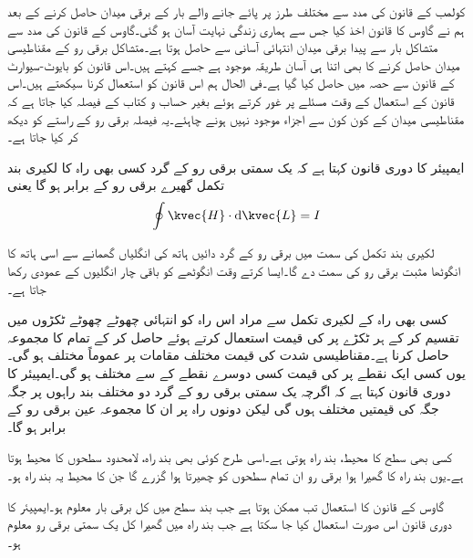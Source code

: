 کولمب کے قانون کی مدد سے مختلف طرز پر پائے جانے والے بار کے برقی میدان حاصل کرنے کے بعد ہم نے گاوس کا قانون اخذ کیا جس سے ہماری زندگی نہایت آسان ہو گئی۔گاوس کے قانون کی مدد سے متشاکل بار سے پیدا برقی میدان انتہائی آسانی سے حاصل ہوتا ہے۔متشاکل برقی رو کے مقناطیسی میدان حاصل کرنے کا بھی اتنا ہی آسان طریقہ موجود ہے جسے  کہتے ہیں۔اس قانون کو بایوٹ-سیوارٹ کے قانون سے حصہ  میں حاصل کیا گیا ہے۔فی الحال ہم اس قانون کو استعمال کرنا سیکھتے ہیں۔اس قانون کے استعمال کے وقت مسئلے پر غور کرتے ہوئے بغیر حساب و کتاب کے فیصلہ کیا جاتا ہے کہ مقناطیسی میدان کے کون کون سے اجزاء موجود نہیں ہونے چاہئے۔یہ فیصلہ برقی رو کے راستے کو دیکھ کر کیا جاتا ہے۔

ایمپیئر کا دوری قانون کہتا ہے کہ یک سمتی برقی رو کے گرد کسی بھی راہ  کا لکیری بند تکمل گھیرے برقی رو کے برابر ہو گا یعنی
\begin{align}\label{مساوات_مقناطیسی_ایمپیئر_کا_دوری_قانون}
\oint \kvec{H} \cdot \dif \kvec{L}=I
\end{align}

لکیری بند تکمل کی سمت میں برقی رو کے گرد  دائیں ہاتھ کی انگلیاں گھمانے سے اسی ہاتھ کا انگوٹھا مثبت برقی رو کی سمت دے گا۔ایسا کرتے وقت انگوٹھے کو باقی چار انگلیوں کے عمودی رکھا جاتا ہے۔

کسی بھی راہ  کے لکیری تکمل سے مراد اس راہ  کو انتہائی چھوٹے چھوٹے ٹکڑوں  میں تقسیم کر کے ہر ٹکڑے پر  کی قیمت استعمال کرتے ہوئے  حاصل کر کے تمام  کا مجموعہ حاصل کرنا ہے۔مقناطیسی شدت  کی قیمت مختلف مقامات پر عموماً مختلف ہو گی۔یوں کسی ایک نقطے پر  کی قیمت کسی دوسرے نقطے کے  سے مختلف ہو گی۔ایمپیئر کا دوری قانون کہتا ہے کہ اگرچہ یک سمتی برقی رو کے گرد دو مختلف بند راہوں پر جگہ جگہ  کی قیمتیں مختلف ہوں گی لیکن دونوں راہ پر ان کا مجموعہ عین برقی رو کے برابر ہو گا۔

کسی بھی سطح کا محیط، بند راہ ہوتی ہے۔اسی طرح کوئی بھی بند راہ، لامحدود سطحوں کا محیط ہوتا ہے۔یوں بند راہ کا گھیرا ہوا برقی رو ان تمام سطحوں کو چھیرتا ہوا گزرے گا جن کا محیط یہ بند راہ ہو۔

گاوس کے قانون کا استعمال تب ممکن ہوتا ہے جب بند سطح میں کل برقی بار معلوم ہو۔ایمپیئر کا دوری قانون اس صورت استعمال کیا جا سکتا ہے جب  بند راہ میں گھیرا کل یک سمتی برقی رو معلوم ہو۔   

